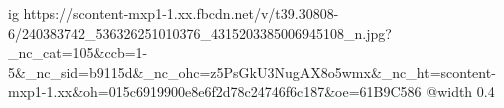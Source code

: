  
 
 
 
 

\ifcmt
  ig https://scontent-mxp1-1.xx.fbcdn.net/v/t39.30808-6/240383742_536326251010376_4315203385006945108_n.jpg?_nc_cat=105&ccb=1-5&_nc_sid=b9115d&_nc_ohc=z5PsGkU3NugAX8o5wmx&_nc_ht=scontent-mxp1-1.xx&oh=015c6919900e8e6f2d78c24746f6c187&oe=61B9C586
  @width 0.4
\fi
